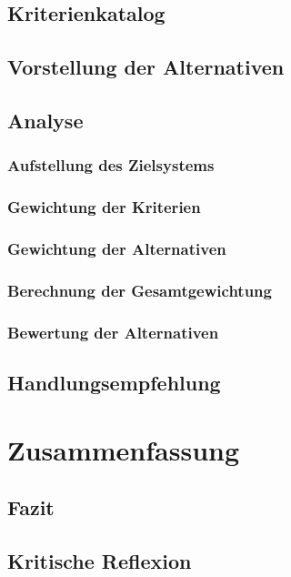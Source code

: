 \section{Kriterienkatalog}
\section{Vorstellung der Alternativen}
\section{Analyse}
\subsection{Aufstellung des Zielsystems}
\subsection{Gewichtung der Kriterien}
\subsection{Gewichtung der Alternativen}
\subsection{Berechnung der Gesamtgewichtung}
\subsection{Bewertung der Alternativen}
\section{Handlungsempfehlung}
\chapter{Zusammenfassung}
\section{Fazit} 
\section{Kritische Reflexion}
